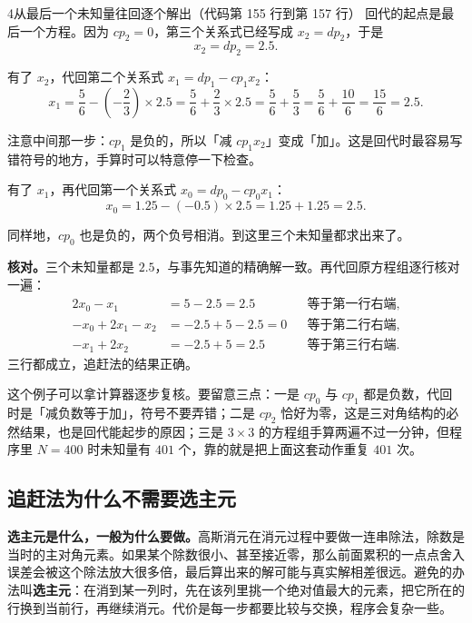 \begin{stepbox}{4}{从最后一个未知量往回逐个解出（代码第 155 行到第 157 行）}
回代的起点是最后一个方程。因为 $cp_2=0$，第三个关系式已经写成 $x_2=dp_2$，于是
\begin{equation}
x_2=dp_2=2.5 .
\label{eq:p5-ex4a}
\end{equation}

有了 $x_2$，代回第二个关系式 $x_1=dp_1-cp_1x_2$：
\begin{equation}
x_1=\frac56-\left(-\frac23\right)\times2.5
=\frac56+\frac23\times2.5
=\frac56+\frac53
=\frac56+\frac{10}{6}
=\frac{15}{6}=2.5 .
\label{eq:p5-ex4b}
\end{equation}

注意中间那一步：$cp_1$ 是负的，所以「减 $cp_1x_2$」变成「加」。这是回代时最容易写错符号的地方，手算时可以特意停一下检查。

有了 $x_1$，再代回第一个关系式 $x_0=dp_0-cp_0x_1$：
\begin{equation}
x_0=1.25-(-0.5)\times2.5=1.25+1.25=2.5 .
\label{eq:p5-ex4c}
\end{equation}

同样地，$cp_0$ 也是负的，两个负号相消。到这里三个未知量都求出来了。
\end{stepbox}

\textbf{核对。}三个未知量都是 $2.5$，与事先知道的精确解一致。再代回原方程组逐行核对一遍：
\begin{equation}
\begin{aligned}
2x_0-x_1&=5-2.5=2.5 &&\text{等于第一行右端},\\
-x_0+2x_1-x_2&=-2.5+5-2.5=0 &&\text{等于第二行右端},\\
-x_1+2x_2&=-2.5+5=2.5 &&\text{等于第三行右端}.
\end{aligned}
\label{eq:p5-ex5}
\end{equation}
三行都成立，追赶法的结果正确。

\keypoint
这个例子可以拿计算器逐步复核。要留意三点：一是 $cp_0$ 与 $cp_1$ 都是负数，代回时是「减负数等于加」，符号不要弄错；二是 $cp_2$ 恰好为零，这是三对角结构的必然结果，也是回代能起步的原因；三是 $3\times3$ 的方程组手算两遍不过一分钟，但程序里 $N=400$ 时未知量有 $401$ 个，靠的就是把上面这套动作重复 $401$ 次。

\subsection{追赶法为什么不需要选主元}

\textbf{选主元是什么，一般为什么要做。}高斯消元在消元过程中要做一连串除法，除数是当时的主对角元素。如果某个除数很小、甚至接近零，那么前面累积的一点点舍入误差会被这个除法放大很多倍，最后算出来的解可能与真实解相差很远。避免的办法叫\textbf{选主元}：在消到某一列时，先在该列里挑一个绝对值最大的元素，把它所在的行换到当前行，再继续消元。代价是每一步都要比较与交换，程序会复杂一些。


